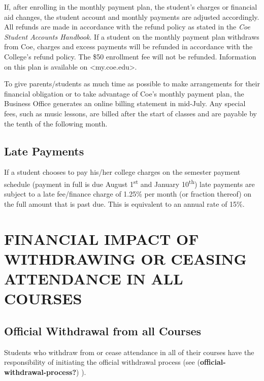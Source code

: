 \documentclass[
  letterpaper,
]{scrbook}
\begin{document}
If, after enrolling in the monthly payment plan, the student's charges
or financial aid changes, the student account and monthly payments are
adjusted accordingly. All refunds are made in accordance with the refund
policy as stated in the \emph{Coe Student Accounts Handbook}. If a
student on the monthly payment plan withdraws from Coe, charges and
excess payments will be refunded in accordance with the College's refund
policy. The \$50 enrollment fee will not be refunded. Information on
this plan is available on \textless my.coe.edu\textgreater.

To give parents/students as much time as possible to make arrangements
for their financial obligation or to take advantage of Coe's monthly
payment plan, the Business Office generates an online billing statement
in mid-July. Any special fees, such as music lessons, are billed after
the start of classes and are payable by the tenth of the following
month.

\hypertarget{late-payments}{%
\subsection{Late Payments}\label{late-payments}}

If a student chooses to pay his/her college charges on the semester
payment schedule (payment in full is due August 1\textsuperscript{st}
and January 10\textsuperscript{th}) late payments are subject to a late
fee/finance charge of 1.25\% per month (or fraction thereof) on the full
amount that is past due. This is equivalent to an annual rate of 15\%.

\hypertarget{financial-impact-of-withdrawing-or-ceasing-attendance-in-all-courses}{%
\section{FINANCIAL IMPACT OF WITHDRAWING OR CEASING ATTENDANCE IN ALL
COURSES}\label{financial-impact-of-withdrawing-or-ceasing-attendance-in-all-courses}}

\hypertarget{official-withdrawal-from-all-courses}{%
\subsection{Official Withdrawal from all
Courses}\label{official-withdrawal-from-all-courses}}

Students who withdraw from or cease attendance in all of their courses
have the responsibility of initiating the official withdrawal process
(see (\textbf{official-withdrawal-process?}) ).
\end{document}
